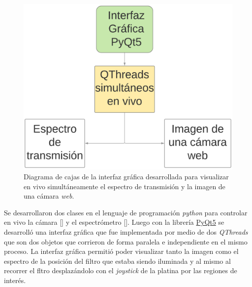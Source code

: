 \begin{figure}[H]
	\centering
	\includegraphics[scale=0.5]{Figs/microespectrometro/interfazespcam.png}
	\caption{Diagrama de cajas de la interfaz gráfica desarrollada para visualizar en vivo simultáneamente el espectro de transmisión y la imagen de una cámara \textit{web}.}
	\label{fig:diagcajas}
\end{figure}

Se desarrollaron dos clases en el lenguaje de programación \textit{python} para controlar en vivo la cámara [\href{https://github.com/jrr1984/defectsGUI/blob/master/views.py}{\faGithub}] y el espectrómetro [\href{https://github.com/jrr1984/defectsGUI/blob/master/Spectrometer.py}{\faGithub}]. Luego con la librería \href{https://pypi.org/project/PyQt5/}{PyQt5} se desarrolló una interfaz gráfica que fue implementada por medio de dos \textit{QThreads} que son dos objetos que corrieron de forma paralela e independiente en el mismo proceso. La interfaz gráfica permitió poder visualizar tanto la imagen como el espectro de la posición del filtro que estaba siendo iluminada y al mismo al recorrer el fltro desplazándolo con el \textit{joystick} de la platina por las regiones de interés.

